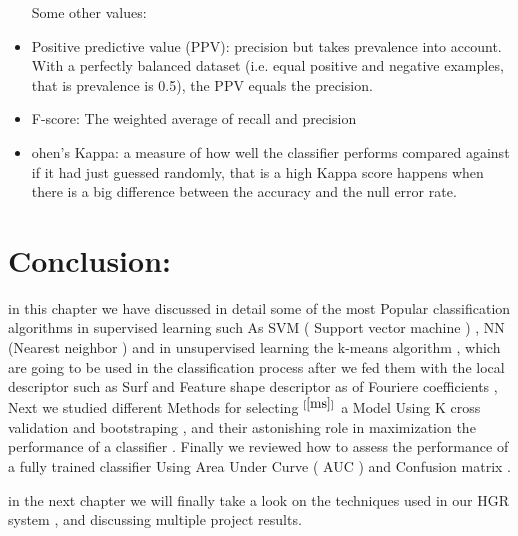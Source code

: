 \begin{itemize}
Some other values:\\

\item Positive predictive value (PPV): precision but takes prevalence into account. With a perfectly balanced dataset (i.e. equal positive and negative examples, that is prevalence is 0.5), the PPV equals the precision.

\item F-score: The weighted average of recall and precision

\item ohen's Kappa: a measure of how well the classifier performs compared against if it had just guessed randomly, that is a high Kappa score happens when there is a big difference between the accuracy and the null error rate.

\end{itemize}



\section{Conclusion:}

in this chapter we have discussed in detail some of the most Popular classification algorithms in supervised  learning such As SVM ( Support vector machine ) , NN (Nearest neighbor ) and in  unsupervised learning the  k-means algorithm  , which are going to be used in the classification process after we fed them with the local descriptor such as Surf and Feature shape descriptor as of Fouriere coefficients ,  Next we studied different Methods for selecting $^{[\ref{ms}]}$ a Model Using K cross validation and bootstraping , and their astonishing role in maximization the performance of a classifier .
Finally we reviewed  how to  assess the performance of a fully trained classifier Using Area Under Curve ( AUC ) and Confusion matrix .

in the next chapter we will finally take a look on the techniques used in our HGR system  , and discussing multiple  project results.    


